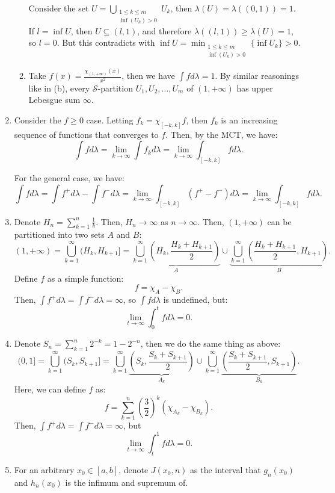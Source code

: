\begin{enumerate}[label=\textbf{3B.\arabic*}]
\begin{enumerate}[label=(\alph*)]
      Consider the set \( U = \bigcup_{\substack{1 \le k \le m\\ \inf (U_{k}) >
      0}} U_{k} \), then \( \lambda(U) = \lambda((0, 1)) = 1 \). If \( l = \inf
      U\), then \( U \subseteq (l, 1) \), and therefore \( \lambda((l, 1)) \ge
      \lambda(U) = 1 \), so \( l = 0 \). But this contradicts with \( \inf U =
      \min_{\substack{1 \le k \le m\\\inf (U_{k}) > 0}} \{\inf U_{k}\}  > 0 \).
    \item Take \( f(x) = \frac{\chi_{(1, +\infty)}(x)}{x^2} \), then we have \(
      \int fd\lambda = 1 \). By similar reasonings like in (b), every \(
      \mathcal{S} \)-partition \( U_{1}, U_{2}, \ldots, U_{m} \) of \( (1,
      +\infty) \) has upper Lebesgue sum \( \infty \).
\end{enumerate}

\item \label{3B5} Consider the \( f \ge 0 \) case.
  Letting \( f_{k} = \chi_{[-k, k]}f \), then \( f_{k} \) is an increasing
  sequence of functions that converges to \( f \). Then, by the MCT, we have:
  \[
    \int f d\lambda = \lim_{ k \to \infty} \int f_{k}d\lambda = \lim_{ k \to
    \infty} \int _{[-k, k]} fd\lambda
  .\]

  For the general case, we have:
  \[
    \int fd\lambda = \int f^{+}d\lambda - \int f^{-} d\lambda = \lim_{ k \to
    \infty} \int _{[-k, k]}\left( f^{+}-f^{-} \right)d\lambda = \lim_{ k \to
    \infty} \int _{[-k, k]} fd\lambda 
  .\] 
\item Denote \( H_{n} = \sum_{k = 1}^{n} \frac{1}{k} \). Then, \( H_{n} \to
  \infty \) as \( n \to \infty \). Then, \( (1, +\infty) \) can be partitioned
  into two sets \( A \) and \( B \):
  \[
    (1, +\infty) = \bigcup_{k = 1}^{\infty} (H_{k}, H_{k + 1}] =
    \underbrace{\bigcup_{k = 1}^{\infty} \left( H_{k}, \frac{H_{k} + H_{k +
    1}}{2} \right) }_{A} \cup 
    \underbrace{\bigcup_{k = 1}^{\infty} \left(\frac{H_{k} + H_{k +
    1}}{2}, H_{k +1} \right) }_{B}
  .\] 
  Define \( f \) as a simple function:
  \[
    f = \chi_{A} - \chi_{B}
  .\] 
  Then, \( \int f^{+}d\lambda = \int f^{-}d\lambda = \infty \), so \( \int
  fd\lambda \) is undefined, but:
  \[
    \lim_{t \to \infty} \int _{0}^{t} fd\lambda = 0
  .\]
\item Denote \( S_{n} = \sum_{k = 1}^{n} 2^{-k} = 1 - 2^{-n} \), then we do the
  same thing as above:
  \[
    (0, 1] = \bigcup_{k=1}^{\infty} (S_{k}, S_{k+1}]
    = \bigcup_{k = 1}^{\infty} \underbrace{\left( S_{k}, \frac{S_{k} + S_{k +
    1}}{2} \right) }_{A_{k}} \cup 
    \bigcup_{k = 1}^{\infty} \underbrace{\left(\frac{S_{k} + S_{k +
    1}}{2}, S_{k +1} \right) }_{B_{k}}
  .\] 
  Here, we can define \( f \) as:
  \[
    f = \sum_{k  =1}^{n} \left( \frac{3}{2} \right) ^{k}(\chi_{A_{k}}-\chi_{B_{k}})
  .\] 
  Then, \( \int f^{+}d\lambda = \int f^{-}d\lambda = \infty \), but
  \[
    \lim_{t \to \infty} \int _{t}^{1} fd\lambda = 0
  .\]
\item 
  For an arbitrary \( x_{0} \in [a, b] \), denote \( J(x_{0}, n) \) as the
  interval that \( g_{n}(x_{0}) \) and \( h_{n}(x_{0}) \) is the infimum and
  supremum of.


\end{enumerate}
